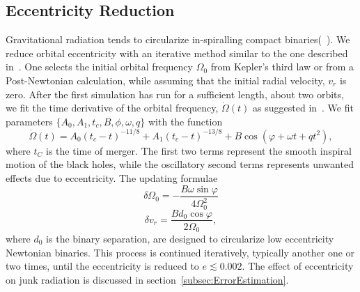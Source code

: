 \subsection{Eccentricity Reduction}
Gravitational radiation tends to circularize in-spiralling compact
binaries(~\cite{PetersMathews1963,Peters1964}). We reduce orbital
eccentricity with an iterative method similar to the one described in~\cite{Boyle2007,Chu2009}. One selects the initial orbital
frequency $\Omega_0$ from Kepler's third law or from a Post-Newtonian
calculation, while assuming that the initial radial velocity, $v_r$ is
zero. After the first simulation has run for a sufficient length, about two orbits, we fit the time derivative of
the orbital frequency, $\dot{\Omega}(t)$ as suggested
in~\cite{Buonanno:2010yk}.  We fit parameters $\{A_0, A_1, t_c, B, \phi, \omega, q\}$ with the function
\begin{equation}
\dot{\Omega}(t)=A_0\left(t_c-t\right)^{-11/8}+A_1\left(t_c-t\right)^{-13/8}
+B\cos\left(\varphi + \omega
  t+qt^2\right),
\end{equation}
where $t_C$ is the time of merger. The first two terms represent the
smooth inspiral motion of the black holes, while the oscillatory
second terms represents unwanted effects due to eccentricity. The
updating formulae
\begin{equation}
\delta\Omega_0=-\frac{B\omega\sin{\varphi}}{4\Omega_0^2}
\end{equation}
\begin{equation}
\delta v_r = \frac{B d_0\cos{\varphi}}{2\Omega_0},
\end{equation}
where $d_0$ is the binary separation, are designed to circularize low eccentricity Newtonian binaries. This
process is continued iteratively, typically another one or two times,
until the eccentricity is reduced to $e\lesssim 0.002$. The effect of
eccentricity on junk radiation is discussed in section~\ref{subsec:ErrorEstimation}.

%

